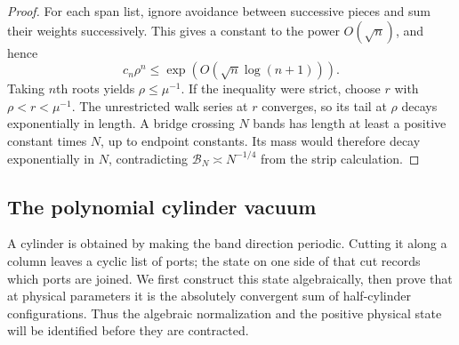 \begin{proof}
For each span list, ignore avoidance between successive pieces and
sum their weights successively. This gives a constant to the power
$O(\sqrt n)$, and hence
\[
 c_n\rho^n\le \exp(O(\sqrt n\log(n+1))).
\]
Taking $n$th roots yields $\rho\le\mu^{-1}$. If the inequality were
strict, choose $r$ with $\rho<r<\mu^{-1}$. The unrestricted walk
series at $r$ converges, so its tail at $\rho$ decays exponentially in
length. A bridge crossing $N$ bands has length at least a positive
constant times $N$, up to endpoint constants. Its mass would therefore
decay exponentially in $N$, contradicting
$\mathcal B_N\asymp N^{-1/4}$ from the strip calculation.
\end{proof}

\subsection{The polynomial cylinder vacuum}

A cylinder is obtained by making the band direction periodic. Cutting
it along a column leaves a cyclic list of ports; the state on one side
of that cut records which ports are joined. We first construct this
state algebraically, then prove that at physical parameters it is the
absolutely convergent sum of half-cylinder configurations. Thus the
algebraic normalization and the positive physical state will be
identified before they are contracted.


